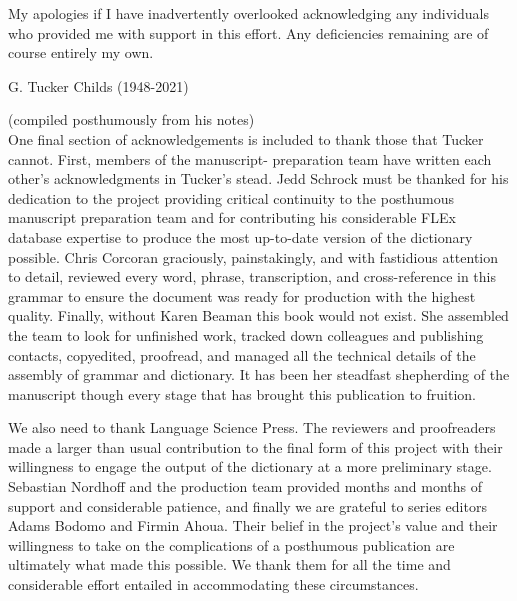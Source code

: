 My apologies if I have inadvertently overlooked acknowledging any individuals who provided me with support in this effort. Any deficiencies remaining are of course entirely my own.

G. Tucker Childs (1948-2021)

(compiled posthumously from his notes)\\


One final section of acknowledgements is included to thank those that Tucker cannot. First, members of the manuscript- preparation team have written each other’s acknowledgments in Tucker’s stead. Jedd Schrock must be thanked for his dedication to the project providing critical continuity to the posthumous manuscript preparation team and for contributing his considerable FLEx database expertise to produce the most up-to-date version of the dictionary possible. Chris Corcoran graciously, painstakingly, and with fastidious attention to detail, reviewed every word, phrase, transcription, and cross-reference in this grammar to ensure the document was ready for production with the highest quality. Finally, without Karen Beaman this book would not exist. She assembled the team to look for unfinished work, tracked down colleagues and publishing contacts, copyedited, proofread, and managed all the technical details of the assembly of grammar and dictionary. It has been her steadfast shepherding of the manuscript though every stage that has brought this publication to fruition.

We also need to thank Language Science Press. The reviewers and proofreaders made a larger than usual contribution to the final form of this project with their willingness to engage the output of the dictionary at a more preliminary stage. Sebastian Nordhoff and the production team provided months and months of support and considerable patience, and finally we are grateful to series editors Adams Bodomo and Firmin Ahoua. Their belief in the project’s value and their willingness to take on the complications of a posthumous publication are ultimately what made this possible. We thank them for all the time and considerable effort entailed in accommodating these circumstances.




